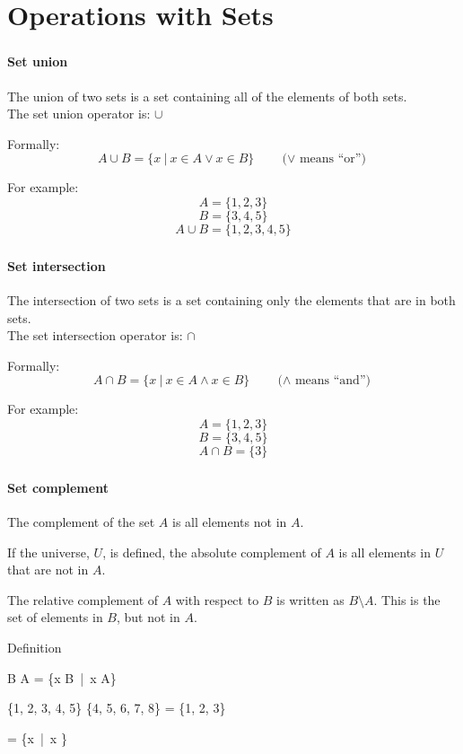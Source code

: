 	\section{Operations with Sets}
	\begin{frame}
		\frametitle{\secname}
		\framesubtitle{Set union}
		The union of two sets is a set containing all of the elements of both sets.
		\\
		The set union operator is: $\cup$

		Formally:
		\[A \cup B = \{x\ |\ x \in A \vee x \in B\} \qquad \text{($\vee$ means ``or'')}\]

		For example:
		\[A = \{1, 2, 3\}\]
		\[B = \{3, 4, 5\}\]
		\[A \cup B = \{1, 2, 3, 4, 5\}\]
	\end{frame}
	\begin{frame}
		\frametitle{\secname}
		\framesubtitle{Set intersection}
		The intersection of two sets is a set containing only the elements that are in both sets.
		\\
		The set intersection operator is: $\cap$

		Formally:
		\[A \cap B = \{x\ |\ x \in A \wedge x \in B\} \qquad \text{($\wedge$ means ``and'')}\]

		For example:
		\[A = \{1, 2, 3\}\]
		\[B = \{3, 4, 5\}\]
		\[A \cap B = \{3\}\]
	\end{frame}
	\begin{frame}
		\frametitle{\secname}
		\framesubtitle{Set complement}
		The \alert{complement} of the set $A$ is all elements not in $A$.

		If the universe, $U$, is defined, the \alert{absolute complement} of $A$ is all elements in $U$ that are not in $A$.
		
		The \alert{relative complement} of $A$ with respect to $B$ is written as $B \setminus A$. This is the set of elements in $B$, but not in $A$.
		\begin{block}{Definition}
			\begin{compactmath}[\large]
				B \setminus A = \{x \in B\ |\ x \notin A\}
			\end{compactmath}
		\end{block}
		\begin{examples}
			\begin{compactmath}
				\{1, 2, 3, 4, 5\} \setminus \{4, 5, 6, 7, 8\} = \{1, 2, 3\}
			\end{compactmath}
			\begin{compactmath}
				 \setminus {} = \{x\ |\ x \text{ is irrational}\}
			\end{compactmath}
		\end{examples}
	\end{frame}

